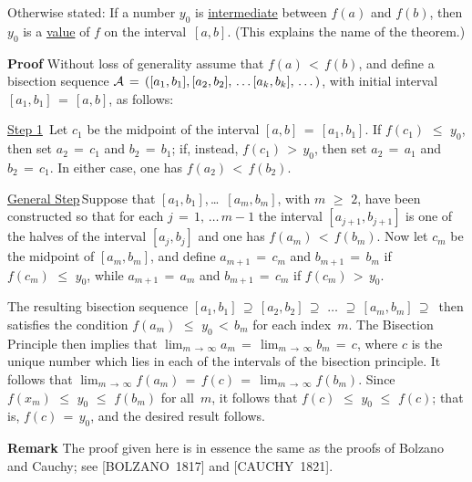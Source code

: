         Otherwise stated: If a number $y_{0}$ is \underline{intermediate} between $f(a)$ and $f(b)$,
    then $y_{0}$ is a \underline{value} of $f$ on the interval~$[a,b]$. (This explains the name of the theorem.)

\V
        {\bf Proof} Without loss of generality assume that $f(a)\,<\,f(b)$, and define a bisection sequence
    ${\cal A} \,=\, ([a_{1},b_{1}], [a_{2},b_{2}],\,{\ldots}\,[a_{k},b_{k}],\,{\ldots}\,)$, 
    with initial interval $[a_{1},b_{1}] \,=\, [a,b]$, as follows:

\VA

        \h \underline{Step 1}\, Let $c_{1}$ be the midpoint of the interval $[a,b] \,=\, [a_{1},b_{1}]$.
    If $f(c_{1})\,\,{\leq}\,\,y_{0}$, then set $a_{2} \,=\, c_{1}$ and $b_{2} \,=\, b_{1}$;
    if, instead, $f(c_{1})\,>\,y_{0}$, then set $a_{2} \,=\, a_{1}$ and $b_{2} \,=\, c_{1}$.
    In either case, one has $f(a_{2})\,<\,f(b_{2})$.

        \h \underline{General Step}\,Suppose that $[a_{1},b_{1}]$,\,{\ldots}\, $[a_{m},b_{m}]$, with $m\,\,{\geq}\,\,2$,
    have been constructed so that for each $j \,=\, 1,\,{\ldots}\,m-1$ the interval
    $[a_{j+1},b_{j+1}]$ is one of the halves of the interval $[a_{j}, b_{j}]$ and one has $f(a_{m})\,<\,f(b_{m})$.
    Now let $c_{m}$ be the midpoint of $[a_{m},b_{m}]$, and define $a_{m+1} \,=\, c_{m}$ and $b_{m+1} \,=\, b_{m}$ if $f(c_{m})\,\,{\leq}\,\,y_{0}$,
    while $a_{m+1} \,=\, a_{m}$ and $b_{m+1} \,=\, c_{m}$ if $f(c_{m})\,>\,y_{0}$.

\VA

\noindent The resulting bisection sequence
    $[a_{1},b_{1}] \,{\supseteq}\, [a_{2},b_{2}] \,{\supseteq}\, \,{\ldots}\, \,{\supseteq}\, [a_{m},b_{m}] \,{\supseteq}\, $
    then satisfies the condition $f(a_{m})\,\,{\leq}\,\,y_{0}\,<\,b_{m}$ for each index~$m$.
    The Bisection Principle then implies that $\lim_{m \,{\rightarrow}\, {\infty}} a_{m} \,=\, \lim_{m \,{\rightarrow}\, {\infty}} b_{m} \,=\, c$,
    where $c$ is the unique number which lies in each of the intervals of the bisection principle.
    It follows that $\lim_{m \,{\rightarrow}\, {\infty}} f(a_{m}) \,=\, f(c) \,=\, \lim_{m \,{\rightarrow}\, {\infty}} f(b_{m})$.
    Since $f(x_{m})\,\,{\leq}\,\,y_{0}\,\,{\leq}\,\,f(b_{m})$ for all~$m$, it follows that $f(c)\,\,{\leq}\,\,y_{0}\,\,{\leq}\,\,f(c)$;
    that is, $f(c) \,=\, y_{0}$, and the desired result follows.

\V

        {\bf Remark} The proof given here is in essence the same as the proofs of Bolzano and Cauchy; see [BOLZANO~1817] and [CAUCHY~1821].

